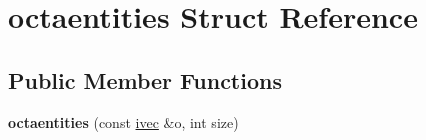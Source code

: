 \hypertarget{structoctaentities}{}\section{octaentities Struct Reference}
\label{structoctaentities}
\subsection*{Public Member Functions}
\begin{DoxyCompactItemize}
\item 
\mbox{\label{structoctaentities_ac7d0848a335d17055a067a54ce66012c}} 
{\bfseries octaentities} (const \hyperlink{structivec}{ivec} \&o, int size)
\end{DoxyCompactItemize}
